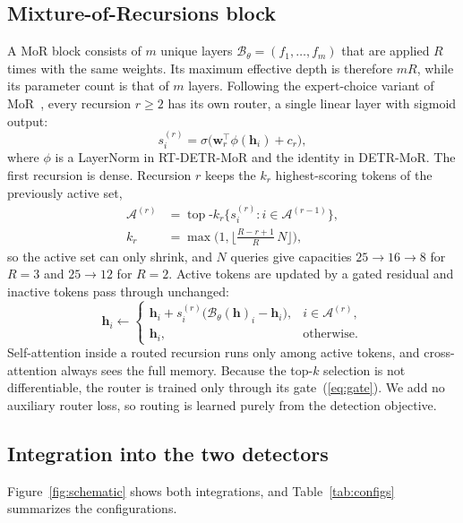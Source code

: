 \documentclass[pdflatex,iicol,sn-basic,Numbered]{sn-jnl}
\begin{document}
\subsection{Mixture-of-Recursions block}\label{sec:mor}
A MoR block consists of $m$ unique layers $\mathcal{B}_\theta=(f_1,\dots,f_m)$ that are applied $R$ times with the same weights. Its maximum effective depth is therefore $mR$, while its parameter count is that of $m$ layers. Following the expert-choice variant of MoR~\cite{bae2025mor,zhou2022expertchoice}, every recursion $r\geq2$ has its own router, a single linear layer with sigmoid output:
\begin{equation}
s^{(r)}_i=\sigma\big(\mathbf{w}_r^{\top}\phi(\mathbf{h}_i)+c_r\big),
\label{eq:router}
\end{equation}
where $\phi$ is a LayerNorm in RT-DETR-MoR and the identity in DETR-MoR. The first recursion is dense. Recursion $r$ keeps the $k_r$ highest-scoring tokens of the previously active set,
\begin{equation}
\begin{aligned}
\mathcal{A}^{(r)}&=\operatorname{top}\text{-}k_r\big\{s^{(r)}_i: i\in\mathcal{A}^{(r-1)}\big\},\\
k_r&=\max\Big(1,\Big\lfloor \tfrac{R-r+1}{R}\,N\Big\rfloor\Big),
\end{aligned}
\label{eq:capacity}
\end{equation}
so the active set can only shrink, and $N$ queries give capacities $25\!\to\!16\!\to\!8$ for $R=3$ and $25\!\to\!12$ for $R=2$. Active tokens are updated by a gated residual and inactive tokens pass through unchanged:
\begin{equation}
\mathbf{h}_i\leftarrow
\begin{cases}
\mathbf{h}_i+s^{(r)}_i\big(\mathcal{B}_\theta(\mathbf{h})_i-\mathbf{h}_i\big), & i\in\mathcal{A}^{(r)},\\
\mathbf{h}_i, & \text{otherwise.}
\end{cases}
\label{eq:gate}
\end{equation}
Self-attention inside a routed recursion runs only among active tokens, and cross-attention always sees the full memory. Because the top-$k$ selection is not differentiable, the router is trained only through its gate~(\ref{eq:gate}). We add no auxiliary router loss, so routing is learned purely from the detection objective.

\subsection{Integration into the two detectors}\label{sec:integration}
Figure~\ref{fig:schematic} shows both integrations, and Table~\ref{tab:configs} summarizes the configurations.
\end{document}
